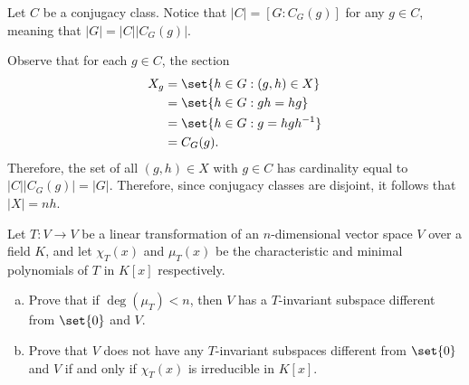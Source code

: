 \documentclass[10pt]{mypackage}
\begin{document}
\begin{solution}
  Let $C$ be a conjugacy class. Notice that $\left\vert C \right\vert = \left[ G:C_G(g) \right]$ for any $g\in C$, meaning that $\left\vert G \right\vert = \left\vert C \right\vert\left\vert C_G(g) \right\vert$.

  Observe that for each $g\in C$, the section
  \begin{align*}
    X_g &= \set{h\in G : \left( g,h \right)\in X}\\
        &= \set{h\in G : gh = hg}\\
        &= \set{h\in G : g = hgh^{-1}}\\
        &= C_G(g).
  \end{align*}
  Therefore, the set of all $\left( g,h \right)\in X$ with $g\in C$ has cardinality equal to $\left\vert C \right\vert\left\vert C_G(g) \right\vert = \left\vert G \right\vert$. Therefore, since conjugacy classes are disjoint, it follows that $\left\vert X \right\vert = nh$.
\end{solution}
\begin{problem}[Problem 4]
  Let $T\colon V\rightarrow V$ be a linear transformation of an $n$-dimensional vector space $V$ over a field $K$, and let $\chi_T(x)$ and $\mu_T(x)$ be the characteristic and minimal polynomials of $T$ in $K[x]$ respectively.
  \begin{enumerate}[(a)]
    \item Prove that if $\deg\left( \mu_T \right) < n$, then $V$ has a $T$-invariant subspace different from $\set{0}$ and $V$.
    \item Prove that $V$ does not have any $T$-invariant subspaces different from $\set{0}$ and $V$ if and only if $\chi_T(x)$ is irreducible in $K[x]$.
  \end{enumerate}
\end{problem}
\end{document}
